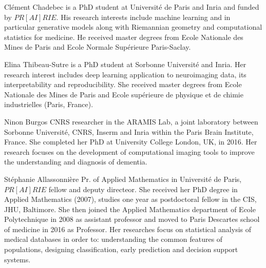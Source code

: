 \documentclass[10pt,journal,compsoc]{IEEEtran}
\begin{document}
\begin{IEEEbiography}{Clément Chadebec} is a PhD student at Université de Paris and Inria and funded by $PR[AI]RIE$. His research interests include machine learning and in particular generative models along with Riemannian geometry and computational statistics for medicine. He received master degrees from Ecole Nationale des Mines de Paris and Ecole Normale Supérieure Paris-Saclay.
\end{IEEEbiography}
\vspace{-2em}
\begin{IEEEbiography}{Elina Thibeau-Sutre} is a PhD student at Sorbonne Université and Inria. Her research interest includes deep learning application to neuroimaging data, its interpretability and reproducibility. She received master degrees from Ecole Nationale des Mines de Paris and Ecole supérieure de physique et de chimie industrielles (Paris, France).
\end{IEEEbiography}
\vspace{-2em}
\begin{IEEEbiography}{Ninon Burgos}
CNRS researcher in the ARAMIS Lab, a joint laboratory between Sorbonne Université, CNRS, Inserm and Inria within the Paris Brain Institute, France. She completed her PhD at University College London, UK, in 2016. Her research focuses on the development of computational imaging tools to improve the understanding and diagnosis of dementia.
\end{IEEEbiography}
\vspace{-2em}
\begin{IEEEbiography}{Stéphanie Allassonnière}
Pr.  of  Applied  Mathematics  in  Université de Paris, $PR[AI]RIE$ fellow and deputy directeor.  She  received  her  PhD  degree  in Applied  Mathematics  (2007),  studies  one  year as postdoctoral fellow in the CIS, JHU, Baltimore. She then joined the Applied Mathematics department of Ecole Polytechnique in  2008  as  assistant  professor  and  moved  to Paris Descartes school of medicine in 2016 as Professor.  Her  researches  focus  on  statistical analysis of medical databases in order to: understanding the common features of populations, designing classification, early prediction and decision support systems.
\end{IEEEbiography}
\end{document}
